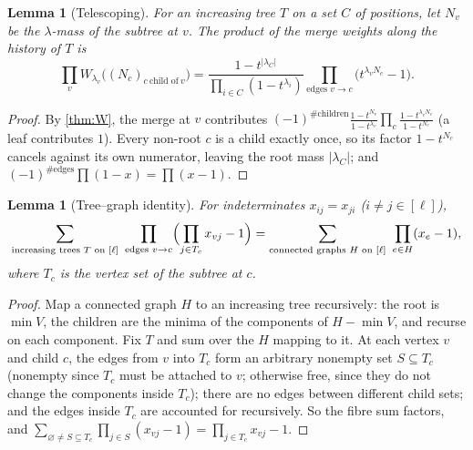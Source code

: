 \documentclass[11pt]{amsart}
\newtheorem{lemma}[theorem]{Lemma}
\theoremstyle{definition}
\theoremstyle{remark}
\numberwithin{equation}{section}
\begin{document}
\begin{lemma}[Telescoping]\label{lem:telescope}
For an increasing tree $T$ on a set $C$ of positions, let $N_v$ be the $\lambda$-mass of the subtree at $v$. The product of the merge weights along the history of $T$ is
\[ \prod_vW_{\lambda_v}\bigl((N_c)_{c\ \text{child of}\ v}\bigr)=\frac{1-t^{|\lambda_C|}}{\prod_{i\in C}(1-t^{\lambda_i})}\prod_{\text{edges }v\to c}\bigl(t^{\lambda_vN_c}-1\bigr). \]
\end{lemma}
\begin{proof}
By \cref{thm:W}, the merge at $v$ contributes $(-1)^{\#\text{children}}\frac{1-t^{N_v}}{1-t^{\lambda_v}}\prod_{c}\frac{1-t^{\lambda_vN_c}}{1-t^{N_c}}$ (a leaf contributes $1$). Every non-root $c$ is a child exactly once, so its factor $1-t^{N_c}$ cancels against its own numerator, leaving the root mass $|\lambda_C|$; and $(-1)^{\#\text{edges}}\prod(1-x)=\prod(x-1)$.
\end{proof}

\begin{lemma}[Tree--graph identity]\label{lem:treegraph}
For indeterminates $x_{ij}=x_{ji}$ ($i\ne j\in[\ell]$),
\[ \sum_{\text{increasing trees }T\text{ on }[\ell]}\ \prod_{\text{edges }v\to c}\Bigl(\prod_{j\in T_c}x_{vj}-1\Bigr)=\sum_{\text{connected graphs }H\text{ on }[\ell]}\ \prod_{e\in H}(x_e-1), \]
where $T_c$ is the vertex set of the subtree at $c$.
\end{lemma}
\begin{proof}
Map a connected graph $H$ to an increasing tree recursively: the root is $\min V$, the children are the minima of the components of $H-\min V$, and recurse on each component. Fix $T$ and sum over the $H$ mapping to it. At each vertex $v$ and child $c$, the edges from $v$ into $T_c$ form an arbitrary nonempty set $S\subseteq T_c$ (nonempty since $T_c$ must be attached to $v$; otherwise free, since they do not change the components inside $T_c$); there are no edges between different child sets; and the edges inside $T_c$ are accounted for recursively. So the fibre sum factors, and $\sum_{\varnothing\ne S\subseteq T_c}\prod_{j\in S}(x_{vj}-1)=\prod_{j\in T_c}x_{vj}-1$.
\end{proof}
\end{document}
